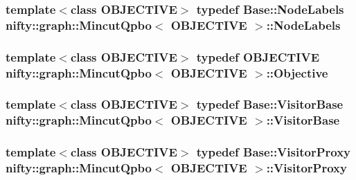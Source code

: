 \subsubsection[{Node\+Labels}]{\setlength{\rightskip}{0pt plus 5cm}template$<$class O\+B\+J\+E\+C\+T\+I\+V\+E$>$ typedef {\bf Base\+::\+Node\+Labels} {\bf nifty\+::graph\+::\+Mincut\+Qpbo}$<$ O\+B\+J\+E\+C\+T\+I\+V\+E $>$\+::{\bf Node\+Labels}}\label{classnifty_1_1graph_1_1MincutQpbo_a6c5fd1d59ebe854e4aafec08563cd91c}
\hypertarget{classnifty_1_1graph_1_1MincutQpbo_a1a2e13cc74cf8ec2bceeb80e73f8b002}{}
\subsubsection[{Objective}]{\setlength{\rightskip}{0pt plus 5cm}template$<$class O\+B\+J\+E\+C\+T\+I\+V\+E$>$ typedef O\+B\+J\+E\+C\+T\+I\+V\+E {\bf nifty\+::graph\+::\+Mincut\+Qpbo}$<$ O\+B\+J\+E\+C\+T\+I\+V\+E $>$\+::{\bf Objective}}\label{classnifty_1_1graph_1_1MincutQpbo_a1a2e13cc74cf8ec2bceeb80e73f8b002}
\hypertarget{classnifty_1_1graph_1_1MincutQpbo_a1ddac4de726b9fcfac58799ab32f3025}{}
\subsubsection[{Visitor\+Base}]{\setlength{\rightskip}{0pt plus 5cm}template$<$class O\+B\+J\+E\+C\+T\+I\+V\+E$>$ typedef {\bf Base\+::\+Visitor\+Base} {\bf nifty\+::graph\+::\+Mincut\+Qpbo}$<$ O\+B\+J\+E\+C\+T\+I\+V\+E $>$\+::{\bf Visitor\+Base}}\label{classnifty_1_1graph_1_1MincutQpbo_a1ddac4de726b9fcfac58799ab32f3025}
\hypertarget{classnifty_1_1graph_1_1MincutQpbo_a89d9a6ede7906b5d0afd49fbb873a6fb}{}
\subsubsection[{Visitor\+Proxy}]{\setlength{\rightskip}{0pt plus 5cm}template$<$class O\+B\+J\+E\+C\+T\+I\+V\+E$>$ typedef {\bf Base\+::\+Visitor\+Proxy} {\bf nifty\+::graph\+::\+Mincut\+Qpbo}$<$ O\+B\+J\+E\+C\+T\+I\+V\+E $>$\+::{\bf Visitor\+Proxy}}\label{classnifty_1_1graph_1_1MincutQpbo_a89d9a6ede7906b5d0afd49fbb873a6fb}


